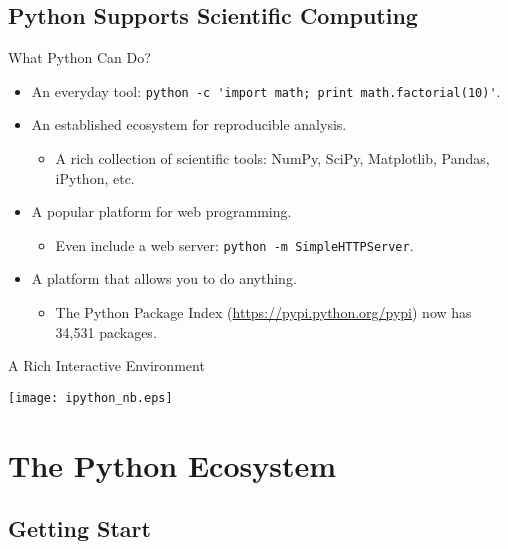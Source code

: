 \documentclass[dvips,xcolor=pst,14pt]{beamer}
\begin{document}
\subsection{
Python Supports Scientific Computing
}

\begin{frame}[fragile]{
%
What Python Can Do?
%
}
\begin{itemize}
  \item An everyday tool:
  {\small \verb+python -c 'import math; print math.factorial(10)'+}.
  \item An established ecosystem for reproducible analysis.
  \begin{itemize}
    \item A rich collection of scientific tools: NumPy, SciPy, Matplotlib,
    Pandas, iPython, etc.
  \end{itemize}
  \item A popular platform for web programming.
  \begin{itemize}
    \item Even include a web server: {\small \verb+python -m SimpleHTTPServer+}.
  \end{itemize}
  \item A platform that allows you to do anything.
  \begin{itemize}
    \item The Python Package Index (\url{https://pypi.python.org/pypi}) now has
    34,531 packages.
  \end{itemize}
\end{itemize}
\end{frame}

\begin{frame}{
%
A Rich Interactive Environment
%
}
\begin{center}
  \texttt{[image: ipython\_nb.eps]}
\end{center}
\end{frame}

\section{
The Python Ecosystem
}

\subsection{
Getting Start
}
\end{document}
